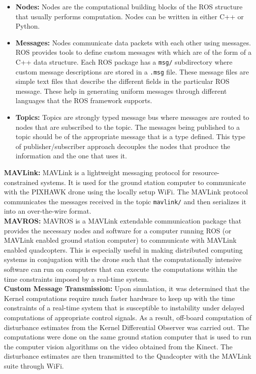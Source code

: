 \documentclass[letterpaper%
, twoside%
, 12pt%
,memoire%
, english%
,creativecommons,hyperref%
]{thETS}
\theoremstyle{newThmStyle}
\begin{document}
\begin{itemize}
	\item \textbf{Nodes:} Nodes are the computational building blocks of the ROS structure that usually performs computation. Nodes can be written in either C++ or Python. 
	\item \textbf{Messages:} Nodes communicate data packets with each other using messages. ROS provides tools to define custom messages with which are of the form of a C++ data structure. Each ROS package has a \texttt{msg/} subdirectory where custom message descriptions are stored in a \texttt{.msg} file. These message files are simple text files that describe the different fields in the particular ROS message. These help in generating uniform messages through different languages that the ROS framework supports. 
	\item \textbf{Topics:} Topics are strongly typed message bus where messages are routed to nodes that are subscribed to the topic. The messages being published to a topic should be of the appropriate message that is a type defined. This type of publisher/subscriber approach decouples the nodes that produce the information and the one that uses it. 
\end{itemize}
\textbf{MAVLink:} MAVLink is a lightweight messaging protocol for resource-constrained systems. It is used for the ground station computer to communicate with the PIXHAWK drone using the locally setup WiFi. The MAVLink protocol communicates the messages received in the topic \texttt{mavlink/} and then serializes it into an over-the-wire format.\\
\textbf{MAVROS:} MAVROS is a MAVLink extendable communication package that provides the necessary nodes and software for a computer running ROS (or MAVLink enabled ground station computer) to communicate with MAVLink enabled quadcopters. This is especially useful in making distributed computing systems in conjugation with the drone such that the computationally intensive software can run on computers that can execute the computations within the time constraints imposed by a real-time system.\\
\textbf{Custom Message Transmission:} Upon simulation, it was determined that the Kernel computations require much faster hardware to keep up with the time constraints of a real-time system that is susceptible to instability under delayed computations of appropriate control signals. As a result, off-board computation of disturbance estimates from the Kernel Differential Observer was carried out. The computations were done on the same ground station computer that is used to run the computer vision algorithms on the video obtained from the Kinect. The disturbance estimates are then transmitted to the Quadcopter with the MAVLink suite through WiFi.
\end{document}
